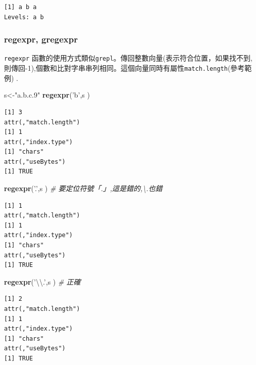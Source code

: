 \documentclass[]{book}
\newenvironment{Shaded}{\begin{snugshade}}{\end{snugshade}}
\newcommand{\CharTok}[1]{\textcolor[rgb]{0.31,0.60,0.02}{#1}}
\newcommand{\CommentTok}[1]{\textcolor[rgb]{0.56,0.35,0.01}{\textit{#1}}}
\newcommand{\KeywordTok}[1]{\textcolor[rgb]{0.13,0.29,0.53}{\textbf{#1}}}
\newcommand{\NormalTok}[1]{#1}
\newcommand{\StringTok}[1]{\textcolor[rgb]{0.31,0.60,0.02}{#1}}
\theoremstyle{definition}
\theoremstyle{definition}
\theoremstyle{definition}
\theoremstyle{remark}
\begin{document}
\begin{verbatim}
[1] a b a
Levels: a b
\end{verbatim}

\hypertarget{regexpr-gregexpr}{%
\subsubsection{regexpr, gregexpr}\label{regexpr-gregexpr}}

\texttt{regexpr}
函數的使用方式類似\texttt{grepl}。傳回整數向量(表示符合位置，如果找不到,則傳回-1),個數和比對字串串列相同。這個向量同時有屬性\texttt{match.length}(參考範例)
.

\begin{Shaded}
\begin{Highlighting}[]
\NormalTok{s<-}\StringTok{"a.b.c.9"}
\KeywordTok{regexpr}\NormalTok{(}\StringTok{'b'}\NormalTok{,s )}
\end{Highlighting}
\end{Shaded}

\begin{verbatim}
[1] 3
attr(,"match.length")
[1] 1
attr(,"index.type")
[1] "chars"
attr(,"useBytes")
[1] TRUE
\end{verbatim}

\begin{Shaded}
\begin{Highlighting}[]
\KeywordTok{regexpr}\NormalTok{(}\StringTok{'.'}\NormalTok{,s ) }\CommentTok{# 要定位符號「.」,這是錯的,\textbackslash{}.也錯}
\end{Highlighting}
\end{Shaded}

\begin{verbatim}
[1] 1
attr(,"match.length")
[1] 1
attr(,"index.type")
[1] "chars"
attr(,"useBytes")
[1] TRUE
\end{verbatim}

\begin{Shaded}
\begin{Highlighting}[]
\KeywordTok{regexpr}\NormalTok{(}\StringTok{'}\CharTok{\textbackslash{}\textbackslash{}}\StringTok{.'}\NormalTok{,s ) }\CommentTok{# 正確}
\end{Highlighting}
\end{Shaded}

\begin{verbatim}
[1] 2
attr(,"match.length")
[1] 1
attr(,"index.type")
[1] "chars"
attr(,"useBytes")
[1] TRUE
\end{verbatim}
\end{document}
